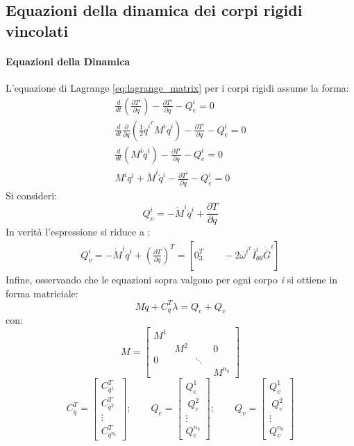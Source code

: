 \subsection{Equazioni della dinamica dei corpi rigidi vincolati}
\paragraph{Equazioni della Dinamica}
L'equazione di Lagrange \ref{eq:lagrange_matrix} per i corpi rigidi assume la forma:
\begin{align} \label{eq:lagrange_body} \nonumber
\frac{d}{dt}\left( \frac{\partial T^i}{\partial\dot{q}}\right) -\frac{\partial T^i}{\partial q} -Q^i_e = 0 \\ \nonumber
\frac{d}{dt}\frac{\partial}{\partial \dot{q}}\left( \frac{1}{2}\dot{q}^{i^T}M^i\dot{q}^i \right) -\frac{\partial T^i}{\partial q} -Q^i_e = 0 \\ \nonumber
\frac{d}{dt}\left( M^i\dot{q}^i \right) -\frac{\partial T^i}{\partial q} -Q^i_e = 0 \\ 
 M^i\ddot{q}^i +\dot{M}^i\dot{q}^i -\frac{\partial T^i}{\partial q} -Q^i_e = 0 
\end{align}
Si consideri:
\begin{equation} \label{eq:Qv}
Q_v^i = -\dot{M}^i\dot{q}^i+\frac{\partial T}{\partial q}
\end{equation}
In verità l'espressione si riduce a \cite{shabana2005} : %
\begin{align} \nonumber
Q_v^i = -\dot{M}^i\dot{q}^i+\left(\frac{\partial T}{\partial q}\right)^T =  [0_3^T \qquad -2\overline{\omega}^{i^T} \overline{I}^i_{\theta\theta}\dot{\overline{G}}^i ]
\end{align}
Infine, osservando che le equazioni sopra valgono per ogni corpo \emph{i} si ottiene in forma matriciale:
\begin{equation} \label{eq:dyn_sys_1stline}
M\ddot{q}+C_q^T\lambda = Q_e + Q_v
\end{equation}
con: 
\[M = \begin{bmatrix}
M^1 & \quad & \quad & \quad \\ \quad & M^2 & \quad & 0 \\ 0 & \quad & \ddots & \quad \\ \quad & \quad & \quad & M^{n_b}\end{bmatrix}\]
\[C_q^T = \begin{bmatrix} C^T_{q^1} \\ C^T_{q^2} \\ \vdots \\ C^T_{q^{n_b}} \end{bmatrix}; \qquad
Q_e = \begin{bmatrix} Q_e^1 \\\ Q_e^2 \\ \vdots \\ Q_e^{n_b} \end{bmatrix}; \qquad
Q_v = \begin{bmatrix} Q_v^1 \\\ Q_v^2 \\ \vdots \\ Q_v^{n_b} \end{bmatrix} \]
